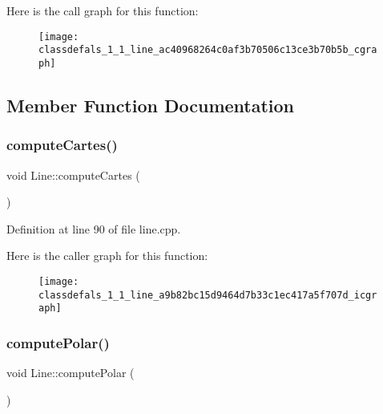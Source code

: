 Here is the call graph for this function\+:\nopagebreak
\begin{figure}[H]
\begin{center}
\leavevmode
\texttt{[image: classdefals\_1\_1\_line\_ac40968264c0af3b70506c13ce3b70b5b\_cgraph]}
\end{center}
\end{figure}


\subsection{Member Function Documentation}
\mbox{\label{classdefals_1_1_line_a9b82bc15d9464d7b33c1ec417a5f707d}} 
\subsubsection{\texorpdfstring{compute\+Cartes()}{computeCartes()}}
{\footnotesize\ttfamily void Line\+::compute\+Cartes (\begin{DoxyParamCaption}{ }\end{DoxyParamCaption})\hspace{0.3cm}{\ttfamily [private]}}



Definition at line 90 of file line.\+cpp.

Here is the caller graph for this function\+:\nopagebreak
\begin{figure}[H]
\begin{center}
\leavevmode
\texttt{[image: classdefals\_1\_1\_line\_a9b82bc15d9464d7b33c1ec417a5f707d\_icgraph]}
\end{center}
\end{figure}
\mbox{\label{classdefals_1_1_line_a82e84373baddc704f337618952c54ccb}} 
\subsubsection{\texorpdfstring{compute\+Polar()}{computePolar()}}
{\footnotesize\ttfamily void Line\+::compute\+Polar (\begin{DoxyParamCaption}{ }\end{DoxyParamCaption})\hspace{0.3cm}{\ttfamily [private]}}



